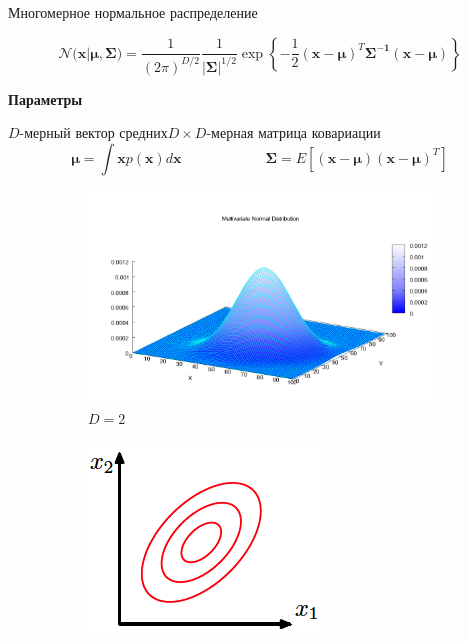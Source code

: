 \documentclass[10pt]{beamer}
\begin{document}
\begin{frame}{Многомерное нормальное распределение}

\[
\mathcal{N(\mathbf{x} | \mathbf{\mu}, \mathbf{\Sigma}}) = \frac{1}{(2 \pi)^{D/2}} \frac{1}{|\mathbf{\Sigma}|^{1/2}} \exp \left\{-\frac{1}{2}(\mathbf{x} - \mathbf{\mu})^T \mathbf{\Sigma^{-1}} (\mathbf{x} - \mathbf{\mu})\right\}
\]

\vspace{0.7em}
\begin{center}
{\bf Параметры}
\end{center}
\quad${D}$-мерный вектор средних\qquad$D \times D$-мерная матрица ковариации 
\[
\mathbf{\mu} = \int \mathbf{x} p({\mathbf{x}}) d\mathbf{x}
\qquad\qquad\qquad
\mathbf{\Sigma} = E[(\mathbf{x} - \mathbf{\mu})(\mathbf{x} - \mathbf{\mu})^T]
\]
\begin{figure}
        \centering
        \begin{subfigure}[b]{0.23\textwidth}
                \includegraphics[width=\textwidth]{images/multi.png}
                \caption{$D = 2$}                
        \end{subfigure}    
        \begin{subfigure}[b]{0.23\textwidth}
                \includegraphics[width=\textwidth]{images/gnormal.png}

\end{subfigure}
\end{figure}
\end{frame}
\end{document}
